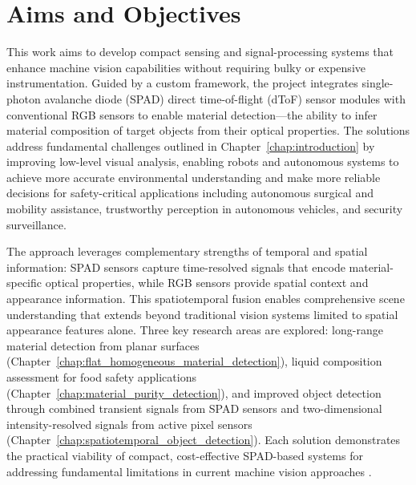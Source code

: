 \documentclass[12pt,a4paper,oneside]{report}
\let\oldsection\section
\renewcommand{\section}{\clearpage\oldsection}
\begin{document}
\vspace{1cm}
\noindent\begin{minipage}{\textwidth}
\setlength{\parindent}{0pt}%
\setlength{\leftskip}{0pt}%
\setlength{\rightskip}{0pt}%
\setlength{\emergencystretch}{3em}%
%
\footnotesize%
\ttfamily%
\color{textgrey}%
\justifying%
\sloppy%
\quotefour
\end{minipage}

\newpage
\section{Aims and Objectives}
\label{sec:aims_objectives}

This work aims to develop compact sensing and signal-processing systems that enhance machine vision capabilities without requiring bulky or expensive instrumentation. Guided by a custom framework, the project integrates single-photon avalanche diode (SPAD) direct time-of-flight (dToF) sensor modules with conventional RGB sensors to enable material detection—the ability to infer material composition of target objects from their optical properties. The solutions address fundamental challenges outlined in Chapter~\ref{chap:introduction} by improving low-level visual analysis, enabling robots and autonomous systems to achieve more accurate environmental understanding and make more reliable decisions for safety-critical applications including autonomous surgical and mobility assistance, trustworthy perception in autonomous vehicles, and security surveillance.

The approach leverages complementary strengths of temporal and spatial information: SPAD sensors capture time-resolved signals that encode material-specific optical properties, while RGB sensors provide spatial context and appearance information. This spatiotemporal fusion enables comprehensive scene understanding that extends beyond traditional vision systems limited to spatial appearance features alone. Three key research areas are explored: long-range material detection from planar surfaces (Chapter~\ref{chap:flat_homogeneous_material_detection}), liquid composition assessment for food safety applications (Chapter~\ref{chap:material_purity_detection}), and improved object detection through combined transient signals from SPAD sensors and two-dimensional intensity-resolved signals from active pixel sensors (Chapter~\ref{chap:spatiotemporal_object_detection}). Each solution demonstrates the practical viability of compact, cost-effective SPAD-based systems for addressing fundamental limitations in current machine vision approaches \cite{sharan2013,schwartz2013}.
\end{document}
